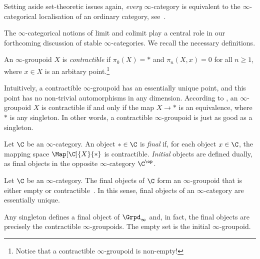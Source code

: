 \documentclass[a4paper]{amsart}
\begin{document}
\begin{remark}
  Setting aside set-theoretic issues again, \emph{every} $\infty$-category is
  equivalent to the $\infty$-categorical localisation of an ordinary category,
  see~\cite{BK12}.
\end{remark}

The $\infty$-categorical notions of limit and colimit play a central role in our
forthcoming discussion of stable $\infty$-categories. We recall the necessary
definitions.

\begin{definition}
  An $\infty$-groupoid $X$ is \emph{contractible} if $\pi_0(X)=*$ and
  $\pi_n(X,x)=0$ for all $n\geq1$, where $x\in X$ is an arbitary
  point.\footnote{Notice that a contractible $\infty$-groupoid is non-empty!}
\end{definition}

\begin{remark}
  Intuitively, a contractible $\infty$-groupoid has an essentially unique point,
  and this point has no non-trivial automorphisms in any dimension. According to
  , an $\infty$-groupoid $X$ is contractible if and
  only if the map $X\to *$ is an equivalence, where $*$ is any singleton. In
  other words, a contractible $\infty$-groupoid is just as good as a singleton.
\end{remark}

\begin{definition}
  Let $\C$ be an $\infty$-category. An object $*\in\C$ is \emph{final} if, for
  each object $x\in\C$, the mapping space $\Map[\C]{X}{*}$ is contractible.
  \emph{Initial} objects are defined dually, as final objects in the opposite
  $\infty$-category $\C^\op$.
\end{definition}

\begin{remark}
  \label{rmk:uniqueness-final_objects}
  Let $\C$ be an $\infty$-category. The final objects of $\C$ form an
  $\infty$-groupoid that is either empty or
  contractible~\cite[Proposition~4.4]{Joy02}. In this sense, final objects of an
  $\infty$-category are essentially unique.
\end{remark}

\begin{example}
  Any singleton defines a final object of $\Grpd_\infty$ and, in fact, the final
  objects are precisely the contractible $\infty$-groupoids. The empty set is
  the initial $\infty$-groupoid.
\end{example}
\end{document}
